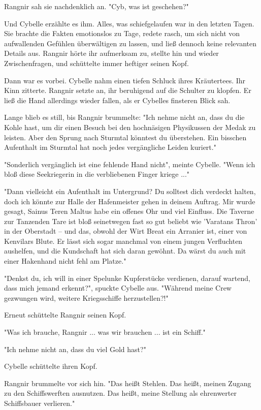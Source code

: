 Rangnir sah sie nachdenklich an. "Cyb, was ist geschehen?"

Und Cybelle erzählte es ihm. Alles, was schiefgelaufen war in den letzten Tagen. Sie brachte die Fakten emotionslos zu Tage, redete rasch, um sich nicht von aufwallenden Gefühlen überwältigen zu lassen, und ließ dennoch keine relevanten Details aus. Rangnir hörte ihr aufmerksam zu, stellte hin und wieder Zwischenfragen, und schüttelte immer heftiger seinen Kopf. 

Dann war es vorbei. Cybelle nahm einen tiefen Schluck ihres Kräutertees. Ihr Kinn zitterte. Rangnir setzte an, ihr beruhigend auf die Schulter zu klopfen. Er ließ die Hand allerdings wieder fallen, als er Cybelles finsteren Blick sah.

Lange blieb es still, bis Rangnir brummelte: "Ich nehme nicht an, dass du die Kohle hast, um dir einen Besuch bei den hochnäsigen Physikussen der Medak zu leisten. Aber den Sprung nach Sturmtal könntest du überstehen. Ein bisschen Aufenthalt im Sturmtal hat noch jedes vergängliche Leiden kuriert."

"Sonderlich vergänglich ist eine fehlende Hand nicht", meinte Cybelle. "Wenn ich bloß diese Seekriegerin in die verbliebenen Finger kriege ..."


"Dann vielleicht ein Aufenthalt im Untergrund? Du solltest dich verdeckt halten, doch ich könnte zur Halle der Hafenmeister gehen in deinem Auftrag. Mir wurde gesagt, Sainus Teren Maltus habe ein offenes Ohr und viel Einfluss. Die Taverne zur Tanzenden Tare ist bloß seinetwegen fast so gut beliebt wie 'Varatans Thron' in der Oberstadt – und das, obwohl der Wirt Breat ein Arranier ist, einer von Kenvilars Blute. Er lässt sich sogar manchmal von einem jungen Verfluchten aushelfen, und die Kundschaft hat sich daran gewöhnt. Da wärst du auch mit einer Hakenhand nicht fehl am Platze."

"Denkst du, ich will in einer Spelunke Kupferstücke verdienen, darauf wartend, dass mich jemand erkennt?", spuckte Cybelle aus. "Während meine Crew gezwungen wird, weitere Kriegsschiffe herzustellen?!"

Erneut schüttelte Rangnir seinen Kopf.

"Was ich brauche, Rangnir ... was wir brauchen ... ist ein Schiff."

"Ich nehme nicht an, dass du viel Gold hast?"

Cybelle schüttelte ihren Kopf.

Rangnir brummelte vor sich hin. "Das heißt Stehlen. Das heißt, meinen Zugang zu den Schiffswerften ausnutzen. Das heißt, meine Stellung als ehrenwerter Schiffsbauer verlieren."

